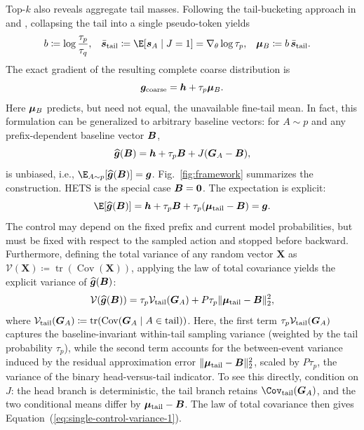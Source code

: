 Top-$k$ also reveals aggregate tail masses.
Following the tail-bucketing approach in \citet{hubotter2026reinforcement} and \citet{huang2026tail}, collapsing the tail into a single pseudo-token yields
\begin{equation}
 \begin{aligned}
 b&\coloneqq\log\frac{\tau_p}{\tau_q}, &
 \bar{\bscore}_{\mathrm{tail}}
 &\coloneqq\E[\bscore_A\mid J=1]
   =\nabla_\theta\log\tau_p, &
 \bmean_B&\coloneqq b\,\bar{\bscore}_{\mathrm{tail}}.
 \end{aligned}
 \label{eq:bucket-vector}
\end{equation}
The exact gradient of the resulting complete coarse distribution is
\begin{equation}
 \bm{g}_{\mathrm{coarse}}
 =\bm{h}+\tau_p\bm{\mu}_B.
 \label{eq:coarse-gradient}
\end{equation}
Here $\bm{\mu}_B$ predicts, but need not equal, the unavailable fine-tail mean. In fact, this formulation can be generalized to arbitrary baseline vectors: for $A\sim p$ and any prefix-dependent baseline vector $\bm{B}$,
\begin{equation}
\widehat{\bm{g}}(\bm{B})=\bm{h}+\tau_p\bm{B}+J(\bm{G}_A-\bm{B}),
\label{eq:residualization}
\end{equation}
is unbiased, i.e., $\E_{A\sim p}\!\left[\widehat{\bgrad}(\bcontrol)\right]=\bgrad$. Fig.~\ref{fig:framework} summarizes the construction.
HETS is the special case $\bm{B}=\bm0$. The expectation is explicit:
\begin{equation}
 \E[\widehat{\bgrad}(\bcontrol)]
 =\bhead+\tau_p\bcontrol
  +\tau_p(\bmean_{\mathrm{tail}}-\bcontrol)
 =\bgrad.
 \label{eq:residualization-expectation}
\end{equation}
The control may depend on the fixed prefix and current model probabilities,
but must be fixed with respect to the sampled action and stopped before
backward.
Furthermore, defining the total variance of any random vector $\bm{X}$ as $\mathcal{V}(\bm{X}) \coloneqq \operatorname{tr}(\operatorname{Cov}(\bm{X}))$, applying the law of total covariance yields the explicit variance of $\widehat{\bm{g}}(\bm B)$:
\begin{equation}
\mathcal{V}(\widehat{\bm{g}}(\bm B)) = \tau_p\mathcal{V}_{\mathrm{tail}}(\bm{G}_A)
+ P\tau_p\lVert\bm{\mu}_{\mathrm{tail}}-\bm B\rVert_2^2,
\label{eq:single-control-variance-1}
\end{equation}
where $\mathcal{V}_{\mathrm{tail}}(\bm{G}_A) \coloneqq \operatorname{tr}(\operatorname{Cov}(\bm{G}_A \mid A \in \mathrm{tail}))$.
Here, the first term $\tau_p\mathcal{V}_{\mathrm{tail}}(\bm{G}_A)$ captures the baseline-invariant within-tail sampling variance (weighted by the tail probability $\tau_p$), while the second term accounts for the between-event variance induced by the residual approximation error $\lVert\bm{\mu}_{\mathrm{tail}}-\bm B\rVert_2^2$, scaled by \(P\tau_p\), the variance of the binary head-versus-tail indicator.
To see this directly, condition on $J$: the head branch is deterministic,
the tail branch retains $\Cov_{\mathrm{tail}}(\btoken_A)$, and the two
conditional means differ by $\bm{\mu}_{\mathrm{tail}}-\bm B$. The law of total
covariance then gives Equation~(\ref{eq:single-control-variance-1}).

